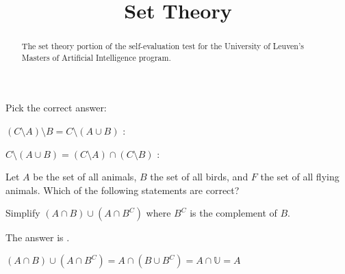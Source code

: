\documentclass{ximera}
\title{Set Theory}
\begin{document}
\begin{abstract}
The set theory portion of the self-evaluation test for the
University of Leuven's Masters of Artificial Intelligence program.
\end{abstract}
\maketitle

Pick the correct answer:
\begin{question}
$(C \setminus A) \setminus B = C \setminus (A \cup B)$ :
\begin{solution}
\begin{multiple-choice}
\end{multiple-choice}
\end{solution}
\end{question}

\begin{question}
$C \setminus (A \cup B) = (C \setminus A) \cap (C\setminus B)$ :
\begin{solution}
\begin{multiple-choice}
\end{multiple-choice}
\end{solution}
\end{question}


\begin{question}
Let $A$ be the set of all animals, $B$ the set of all birds, and $F$
the set of all flying animals. Which of the following statements are correct?
\begin{solution}
\begin{multiple-choice}
\end{multiple-choice}
\end{solution}
\end{question}

\begin{question}
Simplify $(A \cap B) \cup (A \cap B^C)$ where $B^C$ is the complement of $B$.
\begin{solution}
The answer is .
\end{solution}
$(A \cap B) \cup (A \cap B^C) = A \cap (B \cup B^C) = A \cap \mathbb{U} = A$
\end{question}
\end{document}
